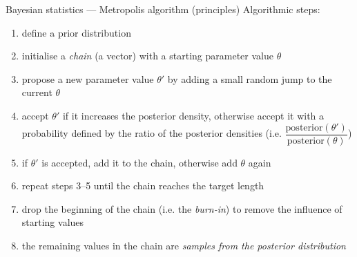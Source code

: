 \documentclass[
  ignorenonframetext,
  aspectratio=169,
  t]{beamer}
\providecommand{\tightlist}{%
  \setlength{\itemsep}{0pt}\setlength{\parskip}{0pt}}
\newcommand{\blueit}[1]{\textcolor{bluebeamer}{\emph{#1}}}
\begin{document}
\begin{frame}{Bayesian statistics --- Metropolis algorithm (principles)}
\protect{}\label{bayesian-statistics-metropolis-algorithm-principles}
Algorithmic steps:

\begin{small}
\begin{enumerate}
\tightlist
\item define a prior distribution
\item initialise a \blueit{chain} (a vector) with a starting parameter value $\theta$
\item propose a new parameter value $\theta'$ by adding a small random jump to the current $\theta$
\item accept $\theta'$ if it increases the posterior density, otherwise accept it with a probability defined by the ratio of the posterior densities (i.e. $\dfrac{\mathrm{posterior}(\theta')}{\mathrm{posterior}(\theta)}$)
\item if $\theta'$ is accepted, add it to the chain, otherwise add $\theta$ again
\item repeat steps 3--5 until the chain reaches the target length
\item drop the beginning of the chain (i.e. the \blueit{burn-in}) to remove the influence of starting values
\item the remaining values in the chain are \blueit{samples from the posterior distribution}
\end{enumerate}
\end{small}
\end{frame}
\end{document}
